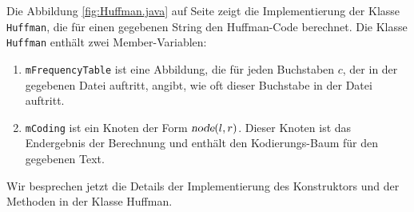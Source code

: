Die Abbildung \ref{fig:Huffman.java} auf Seite \pageref{fig:Huffman.java} zeigt die
Implementierung der Klasse \texttt{Huffman}, die f\"ur einen gegebenen String den
Huffman-Code berechnet. 
Die Klasse \texttt{Huffman} enth\"alt zwei Member-Variablen:
\begin{enumerate}
\item \texttt{mFrequencyTable} ist eine Abbildung, die f\"ur jeden Buchstaben $c$, der in
      der gegebenen Datei auftritt, angibt, wie oft dieser Buchstabe in der Datei auftritt.
\item \texttt{mCoding} ist ein Knoten der Form $\textsl{node}(l,r)$.  Dieser Knoten ist
      das Endergebnis der Berechnung und enth\"alt den Kodierungs-Baum f\"ur den
      gegebenen Text.
\end{enumerate}
Wir besprechen jetzt die Details der Implementierung des Konstruktors und der Methoden in der Klasse
Huffman.
